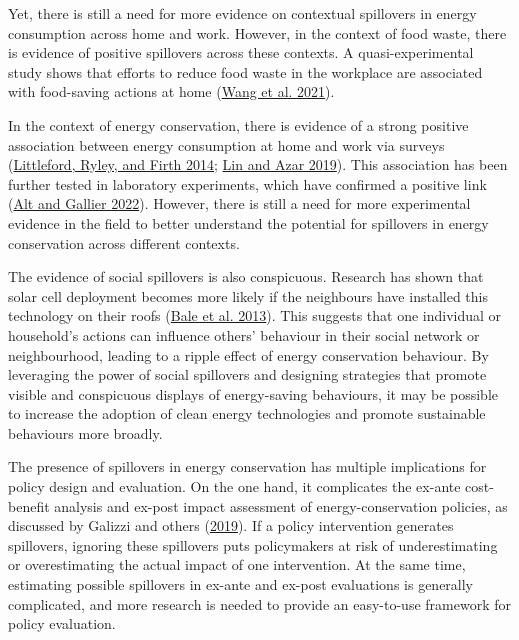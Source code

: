 \documentclass[
  11pt,
]{article}
\begin{document}
Yet, there is still a need for more evidence on contextual spillovers in
energy consumption across home and work. However, in the context of food
waste, there is evidence of positive spillovers across these contexts. A
quasi-experimental study shows that efforts to reduce food waste in the
workplace are associated with food-saving actions at home
(\protect\hyperlink{ref-wang2021take}{Wang et al. 2021}).

In the context of energy conservation, there is evidence of a strong
positive association between energy consumption at home and work via
surveys (\protect\hyperlink{ref-littleford2014context}{Littleford,
Ryley, and Firth 2014}; \protect\hyperlink{ref-lin2019mixing}{Lin and
Azar 2019}). This association has been further tested in laboratory
experiments, which have confirmed a positive link
(\protect\hyperlink{ref-alt2022incentives}{Alt and Gallier 2022}).
However, there is still a need for more experimental evidence in the
field to better understand the potential for spillovers in energy
conservation across different contexts.

The evidence of social spillovers is also conspicuous. Research has
shown that solar cell deployment becomes more likely if the neighbours
have installed this technology on their roofs
(\protect\hyperlink{ref-bale2013harnessing}{Bale et al. 2013}). This
suggests that one individual or household's actions can influence
others' behaviour in their social network or neighbourhood, leading to a
ripple effect of energy conservation behaviour. By leveraging the power
of social spillovers and designing strategies that promote visible and
conspicuous displays of energy-saving behaviours, it may be possible to
increase the adoption of clean energy technologies and promote
sustainable behaviours more broadly.

The presence of spillovers in energy conservation has multiple
implications for policy design and evaluation. On the one hand, it
complicates the ex-ante cost-benefit analysis and ex-post impact
assessment of energy-conservation policies, as discussed by Galizzi and
others (\protect\hyperlink{ref-galizzi2019measure}{2019}). If a policy
intervention generates spillovers, ignoring these spillovers puts
policymakers at risk of underestimating or overestimating the actual
impact of one intervention. At the same time, estimating possible
spillovers in ex-ante and ex-post evaluations is generally complicated,
and more research is needed to provide an easy-to-use framework for
policy evaluation.
\end{document}
